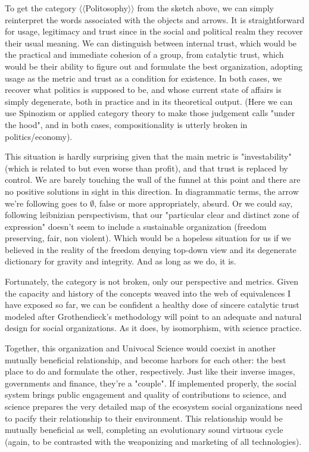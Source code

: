 \documentclass[11pt]{article}
\begin{document}
To get the category \(\langle\!\!\langle\)Politosophy\(\rangle\!\!\rangle\) from the
sketch above, we can simply reinterpret the words associated with the objects and
arrows. It is straightforward for usage, legitimacy and trust since in the social and
political realm they recover their usual meaning. We can distinguish between internal
trust, which would be the practical and immediate cohesion of a group, from catalytic
trust, which would be their ability to figure out and formulate the best organization,
adopting usage as the metric and trust as a condition for existence. In both cases, we
recover what politics is supposed to be, and whose current state of affairs is simply
degenerate, both in practice and in its theoretical output. (Here we can use Spinozism
or applied category theory to make those judgement calls "under the hood", and in both
cases, compositionality is utterly broken in politics/economy).

This situation is hardly surprising given that the main metric is "investability" (which
is related to but even worse than profit), and that trust is replaced by control. We are
barely touching the wall of the funnel at this point and there are no positive solutions
in sight in this direction. In diagrammatic terms, the arrow we're following goes to
\(\emptyset\), false or more appropriately, absurd. Or we could say, following
leibnizian perspectivism, that our "particular clear and distinct zone of expression"
doesn't seem to include a sustainable organization (freedom preserving, fair, non
violent). Which would be a hopeless situation for us if we believed in the reality of
the freedom denying top-down view and its degenerate dictionary for gravity and
integrity. And as long as we do, it is.

Fortunately, the category is not broken, only our perspective and metrics. Given the
capacity and history of the concepts weaved into the web of equivalences I have exposed
so far, we can be confident a healthy dose of sincere catalytic trust modeled after
Grothendieck's methodology will point to an adequate and natural design for social
organizations. As it does, by isomorphism, with science practice.

Together, this organization and Univocal Science would coexist in another mutually
beneficial relationship, and become harbors for each other: the best place to do and
formulate the other, respectively. Just like their inverse images, governments and
finance, they're a "couple". If implemented properly, the social system brings public
engagement and quality of contributions to science, and science prepares the very
detailed map of the ecosystem social organizations need to pacify their relationship to
their environment. This relationship would be mutually beneficial as well, completing an
evolutionary sound virtuous cycle (again, to be contrasted with the weaponizing and
marketing of all technologies).
\end{document}
